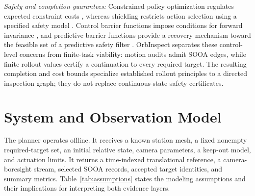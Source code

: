 \documentclass{IEEEtaes}
\theoremstyle{remark}
\theoremstyle{plain}
\begin{document}
\emph{Safety and completion guarantees:} Constrained policy optimization regulates expected constraint costs \cite{achiam2017cpo}, whereas shielding restricts action selection using a specified safety model \cite{alshiekh2018shielding}. Control barrier functions impose conditions for forward invariance \cite{ames2017barrier}, and predictive barrier functions provide a recovery mechanism toward the feasible set of a predictive safety filter \cite{wabersich2023predictive}. OrbInspect separates these control-level concerns from finite-task viability: motion audits admit SOOA edges, while finite rollout values certify a continuation to every required target. The resulting completion and cost bounds specialize established rollout principles to a directed inspection graph; they do not replace continuous-state safety certificates.

\section{System and Observation Model}
\label{sec:system}

The planner operates offline. It receives a known station mesh, a fixed nonempty required-target set, an initial relative state, camera parameters, a keep-out model, and actuation limits. It returns a time-indexed translational reference, a camera-boresight stream, selected SOOA records, accepted target identities, and summary metrics. Table~\ref{tab:assumptions} states the modeling assumptions and their implications for interpreting both evidence layers.
\end{document}
